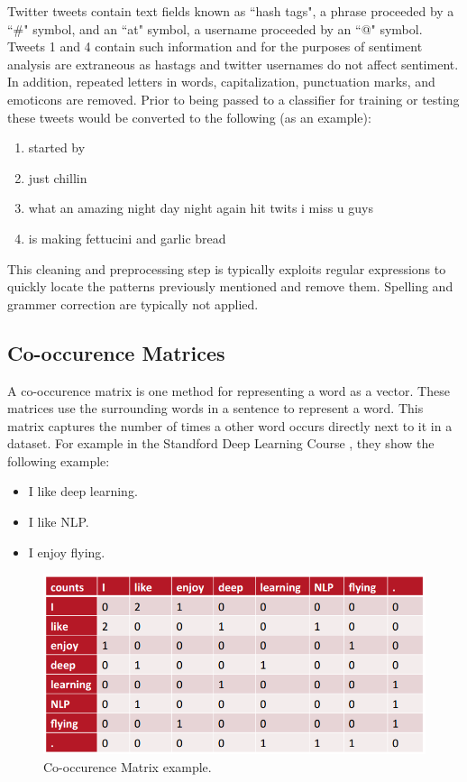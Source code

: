 \documentclass[12pt]{article}
\begin{document}
Twitter tweets contain text fields known as ``hash tags", a phrase proceeded by a ``\#" symbol, and an ``at" symbol, a username proceeded by an ``@" symbol. Tweets 1 and 4 contain such information and for the purposes of sentiment analysis are extraneous as hastags and twitter usernames do not affect sentiment. In addition, repeated letters in words, capitalization, punctuation marks, and emoticons are removed. Prior to being passed to a classifier for training or testing these tweets would be converted to the following (as an example): 

\begin{enumerate}
	\item started by
	\item just chillin
	\item what an amazing night day night again hit twits i miss u guys
	\item is making fettucini and garlic bread
\end{enumerate} 

This cleaning and preprocessing step is typically exploits regular expressions to quickly locate the patterns previously mentioned and remove them. Spelling and grammer correction are typically not applied. 

\subsection{Co-occurence Matrices}

A co-occurence matrix is one method for representing a word as a vector. These matrices use the surrounding words in a sentence to represent a word. This matrix captures the number of times a other word occurs directly next to it in a dataset. For example in the Standford Deep Learning Course \cite{dl_course}, they show the following example:

\begin{itemize}
	\item I like deep learning.
	\item I like NLP.
	\item I enjoy flying.
\end{itemize}

\begin{figure}[htbp!]
	\centering
	\includegraphics[scale=.4]{cooccurence.png}
	\caption{Co-occurence Matrix example.}
	\label{fig:cooccurence}
\end{figure}
\end{document}
